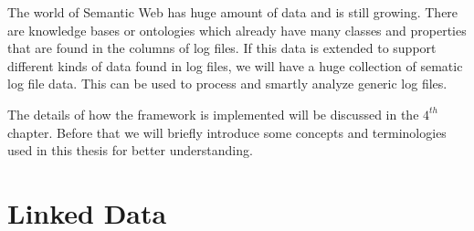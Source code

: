 The world of Semantic Web has huge amount of data and is still growing. There are knowledge bases or ontologies which already have many classes and properties that are found in the columns of log files. If this data is extended to support different kinds of data found in log files, we will have a huge collection of sematic log file data. This can be used to process and smartly analyze generic log files.

The details of how the framework is implemented will be discussed in the $4^{th}$ chapter. Before that we will briefly introduce some concepts and terminologies used in this thesis for better understanding.

\section{Linked Data}
